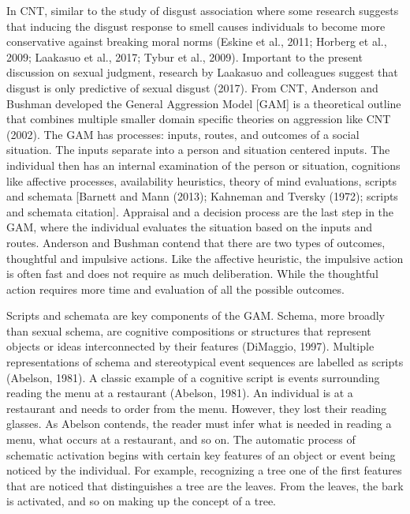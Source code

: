 \documentclass[
  donotrepeattitle,doc, 12pt, a4paper,floatsintext]{apa7}
\begin{document}
In CNT, similar to the study of disgust association where some research suggests that inducing the disgust response to smell causes individuals to become more conservative against breaking moral norms (Eskine et al., 2011; Horberg et al., 2009; Laakasuo et al., 2017; Tybur et al., 2009). Important to the present discussion on sexual judgment, research by Laakasuo and colleagues suggest that disgust is only predictive of sexual disgust (2017). From CNT, Anderson and Bushman developed the General Aggression Model {[}GAM{]} is a theoretical outline that combines multiple smaller domain specific theories on aggression like CNT (2002). The GAM has processes: inputs, routes, and outcomes of a social situation. The inputs separate into a person and situation centered inputs. The individual then has an internal examination of the person or situation, cognitions like affective processes, availability heuristics, theory of mind evaluations, scripts and schemata {[}Barnett and Mann (2013); Kahneman and Tversky (1972); scripts and schemata citation{]}. Appraisal and a decision process are the last step in the GAM, where the individual evaluates the situation based on the inputs and routes. Anderson and Bushman contend that there are two types of outcomes, thoughtful and impulsive actions. Like the affective heuristic, the impulsive action is often fast and does not require as much deliberation. While the thoughtful action requires more time and evaluation of all the possible outcomes.

Scripts and schemata are key components of the GAM. Schema, more broadly than sexual schema, are cognitive compositions or structures that represent objects or ideas interconnected by their features (DiMaggio, 1997). Multiple representations of schema and stereotypical event sequences are labelled as scripts (Abelson, 1981). A classic example of a cognitive script is events surrounding reading the menu at a restaurant (Abelson, 1981). An individual is at a restaurant and needs to order from the menu. However, they lost their reading glasses. As Abelson contends, the reader must infer what is needed in reading a menu, what occurs at a restaurant, and so on. The automatic process of schematic activation begins with certain key features of an object or event being noticed by the individual. For example, recognizing a tree one of the first features that are noticed that distinguishes a tree are the leaves. From the leaves, the bark is activated, and so on making up the concept of a tree.
\end{document}
